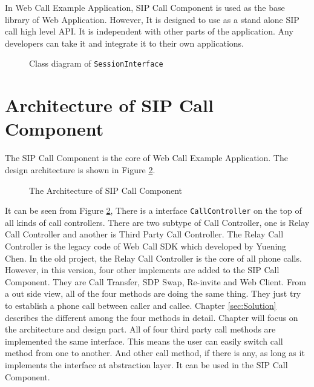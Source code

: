 In Web Call Example Application, SIP Call Component is used as the base library of Web Application. However, It is designed to use as a stand alone SIP call high level API. It is independent with other parts of the application. Any developers can take it and integrate it to their own applications.


\begin{figure}[!hbtp]
\centering
{}
\caption{Class diagram of \texttt{SessionInterface}}
\label{fig:ClassDiagramOfSessionInterface}
\end{figure}



\section{Architecture of SIP Call Component}

The SIP Call Component is the core of Web Call Example Application. The design architecture is shown in Figure \ref{fig:TheArchitectureOfSIPCallComponent}.

\begin{figure}[!hbtp]
\centering
{}
\caption{The Architecture of SIP Call Component}
\label{fig:TheArchitectureOfSIPCallComponent}
\end{figure}

It can be seen from Figure \ref{fig:TheArchitectureOfSIPCallComponent}, There is a interface \texttt{CallController} on the top of all kinds of call controllers. There are two subtype of Call Controller, one is Relay Call Controller and another is Third Party Call Controller. The Relay Call Controller is the legacy code of \textsf{Web Call SDK} which developed by Yuening Chen. In the old project, the Relay Call Controller is the core of all phone calls\cite{WebCallSDK}. However, in this version, four other implements are added to the SIP Call Component. They are Call Transfer, SDP Swap, Re-invite and Web Client. From a out side view, all of the four methods are doing the same thing. They just try to establish a phone call between caller and callee. Chapter \ref{sec:Solution} describes the different among the four methods in detail. Chapter will focus on the architecture and design part. All of four third party call methods are implemented the same interface. This means the user can easily switch call method from one to another. And other call method, if there is any, as long as it implements the interface at abstraction layer. It can be used in the SIP Call Component.

